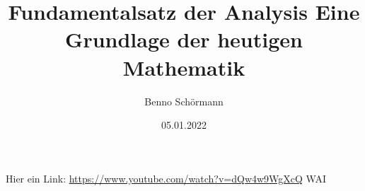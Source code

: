 \documentclass[12pt,a4paper,draft]{article}
\begin{document}
\title{Fundamentalsatz der Analysis\newline
\newline Eine Grundlage der heutigen Mathematik}
\author{Benno Schörmann}
\date{05.01.2022}
\maketitle
Hier ein Link: \url{https://www.youtube.com/watch?v=dQw4w9WgXcQ}
WAI
\end{document}
